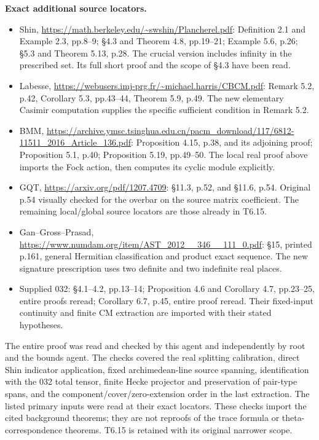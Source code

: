 \textbf{Exact additional source locators.}

\begin{itemize}
\tightlist
\item
  Shin, \url{https://math.berkeley.edu/~swshin/Plancherel.pdf}: Definition 2.1 and Example 2.3, pp.8--9; §4.3 and Theorem 4.8, pp.19--21; Example 5.6, p.26; §5.3 and Theorem 5.13, p.28. The crucial version includes infinity in the prescribed set. Its full short proof and the scope of §4.3 have been read.
\item
  Labesse, \url{https://webusers.imj-prg.fr/~michael.harris/CBCM.pdf}: Remark 5.2, p.42, Corollary 5.3, pp.43--44, Theorem 5.9, p.49. The new elementary Casimir computation supplies the specific sufficient condition in Remark 5.2.
\item
  BMM, \url{https://archive.ymsc.tsinghua.edu.cn/pacm_download/117/6812-11511_2016_Article_136.pdf}: Proposition 4.15, p.38, and its adjoining proof; Proposition 5.1, p.40; Proposition 5.19, pp.49--50. The local real proof above imports the Fock action, then computes its cyclic module explicitly.
\item
  GQT, \url{https://arxiv.org/pdf/1207.4709}: §11.3, p.52, and §11.6, p.54. Original p.54 visually checked for the overbar on the source matrix coefficient. The remaining local/global source locators are those already in T6.15.
\item
  Gan--Gross--Prasad, \url{https://www.numdam.org/item/AST_2012__346__111_0.pdf}: §15, printed p.161, general Hermitian classification and product exact sequence. The new signature prescription uses two definite and two indefinite real places.
\item
  Supplied 032: §4.1--4.2, pp.13--14; Proposition 4.6 and Corollary 4.7, pp.23--25, entire proofs reread; Corollary 6.7, p.45, entire proof reread. Their fixed-input continuity and finite CM extraction are imported with their stated hypotheses.
\end{itemize}

The entire proof was read and checked by this agent and independently by root and the bounds agent. The checks covered the real splitting calibration, direct Shin indicator application, fixed archimedean-line source spanning, identification with the 032 total tensor, finite Hecke projector and preservation of pair-type spans, and the component/cover/zero-extension order in the last extraction. The listed primary inputs were read at their exact locators. These checks import the cited background theorems; they are not reproofs of the trace formula or theta-correspondence theorems. T6.15 is retained with its original narrower scope.

